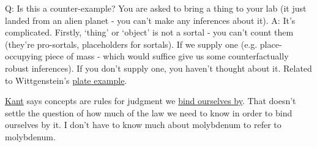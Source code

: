 Q: Is this a counter-example? You are asked to bring a thing to your lab (it just landed from an alien planet - you can't make any inferences about it).
A: It's complicated. Firstly, `thing' or `object' is not a sortal - you can't count them (they're pro-sortals, placeholders for sortals). If we supply one (e.g. place-occupying piece of mass - which would suffice give us some counterfactually robust inferences). If you don't supply one, you haven't thought about it. Related to Wittgenstein's \href{doc/phil/Phil Situations/Plate pointing}{plate example}.

\href{doc/phil/People/Kant}{Kant} says concepts are rules for judgment we \href{doc/phil/People/Brandom/Slogans/Concepts}{bind ourselves by}. That doesn't settle the question of how much of the law we need to know in order to bind ourselves by it. I don't have to know much about molybdenum to refer to molybdenum.



